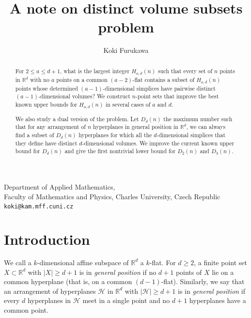 \documentclass[a4paper,oneside,10pt]{amsart}
\title{A note on distinct volume subsets problem}
\author{Koki Furukawa}
\begin{document}
\maketitle
\date{}
\begin{center}
{\footnotesize
Department of Applied Mathematics, \\
Faculty of Mathematics and Physics, Charles University, Czech Republic \\
\texttt{koki@kam.mff.cuni.cz}\\
}
\end{center}



\begin{abstract}
For \(2\le a\le d+1\), what is the largest integer $H_{a,d} (n)$ such that every set of \(n\) points in \(\mathbb{R}^d\) with no \(a\) points on a common \((a-2)\)-flat contains a subset of $H_{a,d} (n)$ points whose determined \((a-1)\)-dimensional simplices have pairwise distinct \((a-1)\)-dimensional volumes?
We construct \(n\)-point sets that improve the best known upper bounds for \(H_{a,d}(n)\) in several cases of $a$ and $d$.

We also study a dual version of the problem. 
Let \(D_d(n)\) the maximum number such that for any arrangement of $n$ hyperplanes in general position in $\mathbb{R}^d$, we can always find a subset of \(D_d(n)\) hyperplanes for which all the $d$-dimensional simplices that they define have distinct $d$-dimensional volumes.
We improve the current known upper bound for \(D_d(n)\) and give the first nontrivial lower bound for $D_2(n)$ and $D_3 (n)$.

\end{abstract}

\vspace{-0.5em}


\section{Introduction}
We call a \(k\)-dimensional affine subspace of \(\mathbb R^d\) a \(k\)-flat.
For \(d\ge 2\), a finite point set \(X\subset \mathbb R^d\) with \(|X|\ge d+1\) is in \emph{general position} if no \(d+1\) points of \(X\) lie on a common hyperplane (that is, on a common \((d-1)\)-flat).
Similarly, we say that an arrangement of hyperplanes \(\mathcal H\) in \(\mathbb R^d\) with \(|\mathcal H|\ge d+1\) is in \emph{general position} if every \(d\) hyperplanes in \(\mathcal H\) meet in a single point and no \(d+1\) hyperplanes have a common point.
\end{document}
